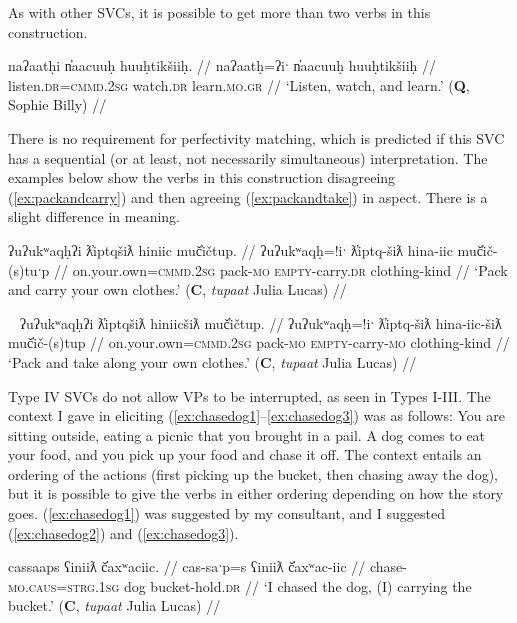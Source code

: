 As with other SVCs, it is possible to get more than two verbs in this construction.

\ex \label{ex:listenwtachlearn}
\begingl
\glpreamble naʔaatḥi n̓aacuuḥ huuḥtikšiiḥ. //
\gla naʔaatḥ=ʔiˑ n̓aacuuḥ huuḥtikšiiḥ //
\glb listen.\textsc{dr}=\textsc{cmmd.2sg} watch.\textsc{dr} learn.\textsc{mo}.\textsc{gr} //
\glft `Listen, watch, and learn.' (\textbf{Q}, Sophie Billy) //
\endgl
\xe

There is no requirement for perfectivity matching, which is predicted if this SVC has a sequential (or at least, not necessarily simultaneous) interpretation. The examples below show the verbs in this construction disagreeing (\ref{ex:packandcarry}) and then agreeing (\ref{ex:packandtake}) in aspect. There is a slight difference in meaning.

\ex \label{ex:packandcarry}
\begingl
\glpreamble ʔuʔukʷaqḥʔi ƛ̓iptqšiƛ hiniic muč̓ičtup. //
\gla ʔuʔukʷaqḥ=!iˑ ƛ̓iptq-šiƛ hina-iic muč̓ič-(s)tuˑp //
\glb on.your.own=\textsc{cmmd.2sg} pack-\textsc{mo} \textsc{empty}-carry.\textsc{dr} clothing-kind //
\glft `Pack and carry your own clothes.' (\textbf{C}, \textit{tupaat} Julia Lucas) //
\endgl
\xe

\ex~ \label{ex:packandtake}
\begingl
\glpreamble ʔuʔukʷaqḥʔi ƛ̓iptqšiƛ hiniicšiƛ muč̓ičtup. //
\gla ʔuʔukʷaqḥ=!iˑ ƛ̓iptq-šiƛ hina-iic-šiƛ muč̓ič-(s)tup //
\glb on.your.own=\textsc{cmmd.2sg} pack-\textsc{mo} \textsc{empty}-carry-\textsc{mo} clothing-kind //
\glft `Pack and take along your own clothes.' (\textbf{C}, \textit{tupaat} Julia Lucas) //
\endgl
\xe

Type IV SVCs do not allow VPs to be interrupted, as seen in Types I-III. The context I gave in eliciting (\ref{ex:chasedog1}--\ref{ex:chasedog3}) was as follows: You are sitting outside, eating a picnic that you brought in a pail. A dog comes to eat your food, and you pick up your food and chase it off. The context entails an ordering of the actions (first picking up the bucket, then chasing away the dog), but it is possible to give the verbs in either ordering depending on how the story goes. (\ref{ex:chasedog1}) was suggested by my consultant, and I suggested (\ref{ex:chasedog2}) and (\ref{ex:chasedog3}). 

\ex \label{ex:chasedog1}
\begingl
\glpreamble cassaaps ʕiniiƛ č̓axʷaciic. //
\gla cas-saˑp=s ʕiniiƛ č̓axʷac-iic //
\glb chase-\textsc{mo.caus}=\textsc{strg.1sg} dog bucket-hold.\textsc{dr} //
\glft `I chased the dog, (I) carrying the bucket.' (\textbf{C}, \textit{tupaat} Julia Lucas) //
\endgl
\xe

